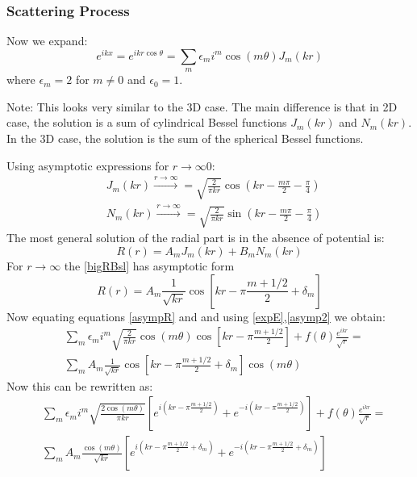 \subsubsection{Scattering Process}

Now we expand:
\begin{equation}\label{expE}
e^{ikx} = e^{ikr\cos\theta} = \sum_m{\epsilon_m i^m \cos(m\theta)J_m(kr)}
\end{equation}
where $\epsilon_m = 2 $ for $ m \neq 0 $ and $ \epsilon_0 = 1 $.

Note: This looks very similar to the 3D case. The main difference is that in 2D case, the solution is a sum of cylindrical Bessel functions $ J_m(kr) $ and $ N_m(kr) $.
In the 3D case, the solution is the sum of the spherical Bessel functions.

Using asymptotic expressions for $ r \rightarrow \infty 0$:
\begin{equation}\label{}
\begin{split}
& J_m(kr) \xrightarrow{r \rightarrow \infty}  = \sqrt{\frac{2}{\pi k r}}\cos\left(kr - \frac{m\pi}{2} - \frac{\pi}{4}\right) \\[.7em]
& N_m(kr) \xrightarrow{r \rightarrow \infty}  = \sqrt{\frac{2}{\pi k r}}\sin\left(kr - \frac{m\pi}{2} - \frac{\pi}{4}\right)
\end{split}
\end{equation}
The most general solution of the radial part is in the absence of potential is:
\begin{equation}\label{bigRBsl}
R(r) = A_mJ_m(kr) + B_mN_m(kr) 
\end{equation}
For $ r \rightarrow\infty $ the \eqref{bigRBsl} has asymptotic form
\begin{equation}\label{asympR}
R(r) = A_m\frac{1}{\sqrt{kr}}\cos\left[kr-\pi\frac{m + 1/2}{2} + \delta_m\right]
\end{equation}
Now equating equations \eqref{asympR} and and using \eqref{expE},\eqref{asymp2} we obtain:
\begin{equation}\label{asymR2}
\begin{split}
& \sum_m{\epsilon_m i^m\sqrt{\frac{2}{\pi kr}}\cos(m\theta)\cos\left[kr-\pi\frac{m + 1/2}{2}\right]} + f(\theta)\frac{e^{ikr}}{\sqrt{r}} = \\[.7em]
& \sum_m{A_m\frac{1}{\sqrt{kr}}\cos\left[kr-\pi\frac{m + 1/2}{2} + \delta_m\right]\cos(m\theta)}
\end{split}
\end{equation}
Now this can be rewritten as:
\begin{equation}\label{asyR3}
\begin{split}
& \sum_m{\epsilon_m i^m \sqrt{\frac{2\cos(m\theta)}{\pi kr}}\left[e^{i\left(kr-\pi\frac{m + 1/2}{2}\right)} + e^{-i\left(kr-\pi\frac{m + 1/2}{2}\right)}\right]}
+ f(\theta)\frac{e^{ikr}}{\sqrt{r}} = \\[.7em]
& \sum_m{A_m\frac{\cos(m\theta)}{\sqrt{kr}}\left[e^{i\left(kr-\pi\frac{m + 1/2}{2} + \delta_m\right)} + e^{-i\left(kr-\pi\frac{m + 1/2}{2} + \delta_m\right)}\right]}
\end{split}
\end{equation}
